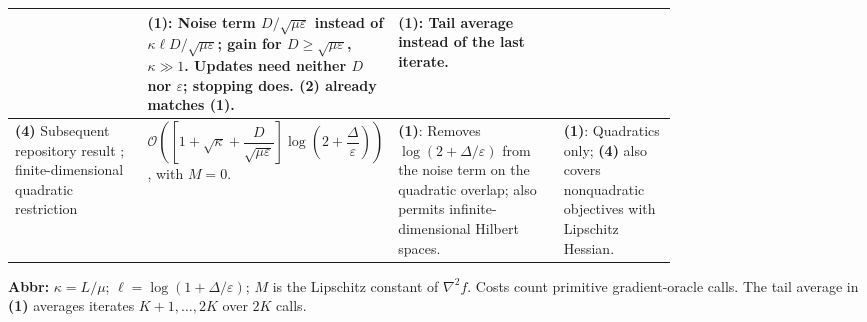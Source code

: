 \begin{table}[tp]
\begin{threeparttable}
\begin{tabularx}{\linewidth}{@{}>{\raggedright\arraybackslash}p{0.20\linewidth}>{\raggedright\arraybackslash}p{0.32\linewidth}>{\raggedright\arraybackslash}p{0.25\linewidth}>{\raggedright\arraybackslash}X@{}}
& \textbf{(1)}: Noise term $D/\sqrt{\mu\varepsilon}$ instead of $\kappa\ell D/\sqrt{\mu\varepsilon}$; gain for $D\ge\sqrt{\mu\varepsilon}$, $\kappa\gg1$. Updates need neither $D$ nor $\varepsilon$; stopping does. \textbf{(2)} already matches \textbf{(1)}.
& \textbf{(1)}: Tail average instead of the last iterate. \\
\midrule
\textbf{(4)} Subsequent repository result \citep{qtdNonlinearTemporalRepository}; finite-dimensional quadratic restriction
& $\mathcal{O}\!\left(\left[1+\sqrt{\kappa}+\dfrac{D}{\sqrt{\mu\varepsilon}}\right]\log\!\left(2+\dfrac{\Delta}{\varepsilon}\right)\right)$, with $M=0$.
& \textbf{(1)}: Removes $\log(2+\Delta/\varepsilon)$ from the noise term on the quadratic overlap; also permits infinite-dimensional Hilbert spaces.
& \textbf{(1)}: Quadratics only; \textbf{(4)} also covers nonquadratic objectives with Lipschitz Hessian. \\
\bottomrule
\end{tabularx}
\begin{tablenotes}[flushleft]\footnotesize
\item[] \textbf{Abbr:} $\kappa=L/\mu$; $\ell=\log(1+\Delta/\varepsilon)$; $M$ is the Lipschitz constant of $\nabla^2 f$. Costs count primitive gradient-oracle calls. The tail average in \textbf{(1)} averages iterates $K+1,\ldots,2K$ over $2K$ calls.
\end{tablenotes}
\end{threeparttable}
\end{table}
\clearpage

